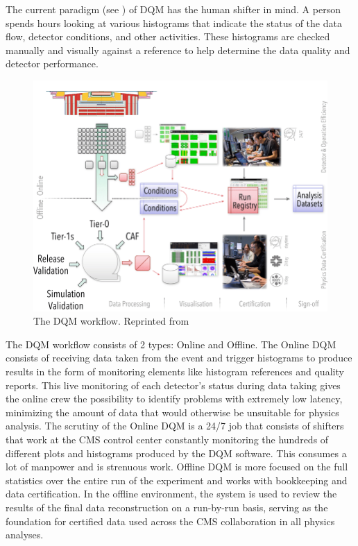 The current paradigm (see ) of DQM has the human shifter in mind. A person spends hours looking at various histograms that indicate the status of the data flow, detector conditions, and other activities. These histograms are checked manually and visually against a reference to help determine the data quality and detector performance.
\begin{figure}
	\centering
	\includegraphics[width=.89\linewidth]{Images/DQM Workflow.png}
	\caption[The DQM workflow]{The DQM workflow. Reprinted from \cite{DQM_workflow}}
	\label{fig:DQM_workflow}
\end{figure}
The DQM workflow consists of 2 types: Online and Offline.
The Online DQM consists of receiving data taken from the event and trigger histograms to produce results in the form of monitoring elements like histogram references and quality reports. This live monitoring of each detector’s status during data taking gives the online crew the possibility to identify problems with extremely low latency, minimizing the amount of data that would otherwise be unsuitable for physics analysis. The scrutiny of the Online DQM is a 24/7 job that consists of shifters that work at the CMS control center constantly monitoring the hundreds of different plots and histograms produced by the DQM software. This consumes a lot of manpower and is strenuous work.
Offline DQM is more focused on the full statistics over the entire run of the experiment and works with bookkeeping and data certification. In the offline environment, the system is used to review the results of the final data reconstruction on a run-by-run basis, serving as the foundation for certified data used across the CMS collaboration in all physics analyses.


